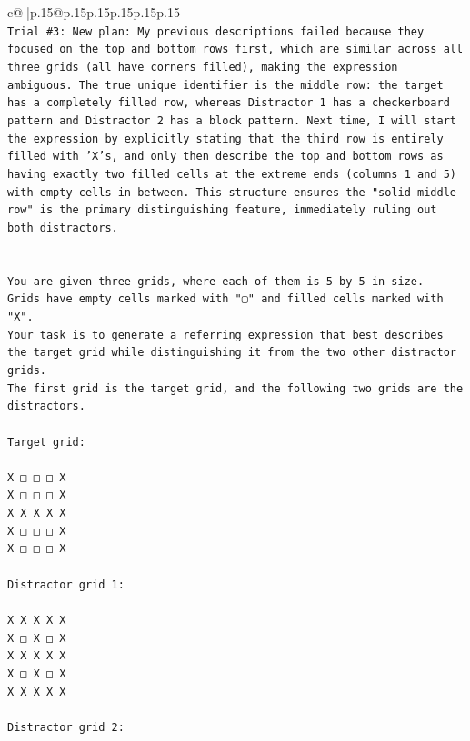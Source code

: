 \documentclass{article}
\begin{document}
{\begin{supertabular}{c@{$\;$}|p{.15\linewidth}@{}p{.15\linewidth}p{.15\linewidth}p{.15\linewidth}p{.15\linewidth}p{.15\linewidth}}
{{{\\ 
\texttt{Trial \#3: New plan: My previous descriptions failed because they focused on the top and bottom rows first, which are similar across all three grids (all have corners filled), making the expression ambiguous. The true unique identifier is the middle row: the target has a completely filled row, whereas Distractor 1 has a checkerboard pattern and Distractor 2 has a block pattern. Next time, I will start the expression by explicitly stating that the third row is entirely filled with 'X's, and only then describe the top and bottom rows as having exactly two filled cells at the extreme ends (columns 1 and 5) with empty cells in between. This structure ensures the "solid middle row" is the primary distinguishing feature, immediately ruling out both distractors.} \\
\\ 
\\ 
\texttt{You are given three grids, where each of them is 5 by 5 in size.} \\
\texttt{Grids have empty cells marked with "▢" and filled cells marked with "X".} \\
\texttt{Your task is to generate a referring expression that best describes the target grid while distinguishing it from the two other distractor grids.} \\
\texttt{The first grid is the target grid, and the following two grids are the distractors.} \\
\\ 
\texttt{Target grid:} \\
\\ 
\texttt{X □ □ □ X} \\
\texttt{X □ □ □ X} \\
\texttt{X X X X X} \\
\texttt{X □ □ □ X} \\
\texttt{X □ □ □ X} \\
\\ 
\texttt{Distractor grid 1:} \\
\\ 
\texttt{X X X X X} \\
\texttt{X □ X □ X} \\
\texttt{X X X X X} \\
\texttt{X □ X □ X} \\
\texttt{X X X X X} \\
\\ 
\texttt{Distractor grid 2:} \\
\\ 
}}}
\end{supertabular}}
\end{document}
